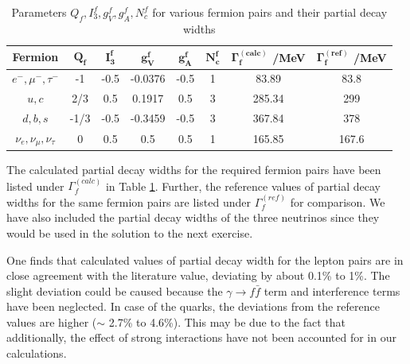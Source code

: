 \begin{table}[h!]
\centering
\begin{tabular}{|c|c|c|c|c|c|c|c|}
\hline
\textbf{Fermion} & $\mathbf{Q_{f}}$ & $\mathbf{I_{3}^{f}}$ & $\mathbf{g_{V}^{f}}$ & $\mathbf{g_{A}^{f}}$ & $\mathbf{N_{c}^{f}}$ & $\mathbf{\Gamma_{f}^{(calc)}}$ /\textbf{MeV} & $\mathbf{\Gamma_{f}^{(ref)}}$ /\textbf{MeV}\\
\hline
$e^{-}, \mu^{-}, \tau^{-}$ & -1 & -0.5 & -0.0376 & -0.5 & 1 & 83.89 & 83.8\\
\hline
$u,c$ & 2/3 & 0.5 & 0.1917 & 0.5 & 3 & 285.34 & 299\\
\hline
$d, b, s$ & -1/3 & -0.5 & -0.3459 & -0.5 & 3 & 367.84 & 378\\
\hline
$\nu_{e}, \nu_{\mu}, \nu_{\tau}$ & 0 & 0.5 & 0.5 & 0.5 & 1 & 165.85 & 167.6\\
\hline
\end{tabular}
\caption{Parameters $Q_{f}, I_{3}^{f}, g_{V}^{f}, g_{A}^{f}, N_{c}^{f}$ for various fermion pairs and their partial decay widths}
\label{partialdecays}
\end{table}

The calculated partial decay widths for the required fermion pairs have been listed under $\Gamma_{f}^{(calc)}$ in Table \ref{partialdecays}. Further, the reference \cite{UB} values of partial decay widths for the same fermion pairs are listed under $\Gamma_{f}^{(ref)}$ for comparison. We have also included the partial decay widths of the three neutrinos since they would be used in the solution to the next exercise. 

One finds that calculated values of partial decay width for the lepton pairs are in close agreement with the literature value, deviating by about 0.1\% to 1\%. The slight deviation could be caused because the $\gamma\rightarrow f\bar{f}$ term and interference terms have been neglected. In case of the quarks, the deviations from the reference values are higher ($\sim$ 2.7\% to 4.6\%). This may be due to the fact that additionally, the effect of strong interactions have not been accounted for in our calculations.

